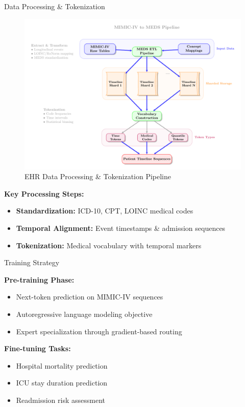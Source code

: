 \documentclass[final]{beamer}
\newlength{\colwidth}
\begin{document}
\begin{frame}[t]
\begin{columns}[t]
\begin{column}{\colwidth}
\begin{block}{Data Processing \& Tokenization}
    \begin{figure}
        \centering
        \includegraphics[width=0.75\linewidth]{figures/ehr_preprocessing_pipeline.pdf}
        \caption{EHR Data Processing \& Tokenization Pipeline}
        \label{fig:preprocessing_pipeline}
    \end{figure}

    \textbf{Key Processing Steps:}
    \begin{itemize}
        \item \textbf{Standardization:} ICD-10, CPT, LOINC medical codes
        \item \textbf{Temporal Alignment:} Event timestamps \& admission sequences  
        \item \textbf{Tokenization:} Medical vocabulary with temporal markers
    \end{itemize}

  \end{block}

  \begin{block}{Training Strategy}
    
    \textbf{Pre-training Phase:}
    \begin{itemize}
        \item Next-token prediction on MIMIC-IV sequences
        \item Autoregressive language modeling objective
        \item Expert specialization through gradient-based routing
    \end{itemize}

    \textbf{Fine-tuning Tasks:}
    \begin{itemize}
        \item Hospital mortality prediction
        \item ICU stay duration prediction
        \item Readmission risk assessment
    \end{itemize}


\end{block}
\end{column}
\end{columns}
\end{frame}
\end{document}
